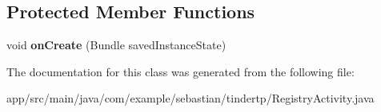\subsection*{Protected Member Functions}
\begin{DoxyCompactItemize}
\item 
void {\bfseries on\+Create} (Bundle saved\+Instance\+State)\hypertarget{classcom_1_1example_1_1sebastian_1_1tindertp_1_1RegistryActivity_a238ec2c0a37bef50d5899980803cc946}{}\label{classcom_1_1example_1_1sebastian_1_1tindertp_1_1RegistryActivity_a238ec2c0a37bef50d5899980803cc946}

\end{DoxyCompactItemize}


The documentation for this class was generated from the following file\+:\begin{DoxyCompactItemize}
\item 
app/src/main/java/com/example/sebastian/tindertp/Registry\+Activity.\+java\end{DoxyCompactItemize}

